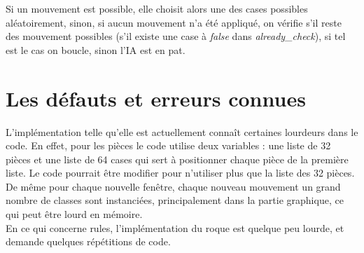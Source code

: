 \documentclass[a4paper]{article}
\begin{document}
Si un mouvement est possible, elle choisit alors une des cases possibles aléatoirement, sinon, si aucun mouvement n'a été appliqué, on vérifie s'il reste des mouvement possibles (s'il existe une case à \textit{false} dans \textit{already\_check}), si tel est le cas on boucle, sinon l'IA est en pat. 

\section{Les défauts et erreurs connues}

L'implémentation telle qu'elle est actuellement connaît certaines lourdeurs dans le code. En effet, pour les pièces le code utilise deux variables : une liste de 32 pièces et une liste de 64 cases qui sert à positionner chaque pièce de la première liste. Le code pourrait être modifier pour n'utiliser plus que la liste des 32 pièces. \\

De même pour chaque nouvelle fenêtre, chaque nouveau mouvement un grand nombre de classes sont instanciées, principalement dans la partie graphique, ce qui peut être lourd en mémoire. \\ 

En ce qui concerne rules, l'implémentation du roque est quelque peu lourde, et demande quelques répétitions de code. \\
\end{document}

